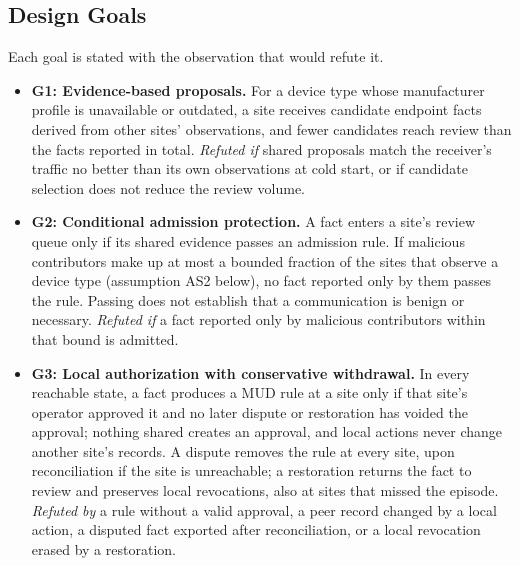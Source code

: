 \documentclass[journal]{IEEEtran}
\theoremstyle{definition}
\begin{document}
\subsection{Design Goals}
\label{subsec:goals}
Each goal is stated with the observation that would refute it.

\begin{itemize}
\item \textbf{G1: Evidence-based proposals.} For a device type whose manufacturer profile is unavailable or outdated, a site receives candidate endpoint facts derived from other sites' observations, and fewer candidates reach review than the facts reported in total. \emph{Refuted if} shared proposals match the receiver's traffic no better than its own observations at cold start, or if candidate selection does not reduce the review volume.

\item \textbf{G2: Conditional admission protection.} A fact enters a site's review queue only if its shared evidence passes an admission rule. If malicious contributors make up at most a bounded fraction of the sites that observe a device type (assumption AS2 below), no fact reported only by them passes the rule. Passing does not establish that a communication is benign or necessary. \emph{Refuted if} a fact reported only by malicious contributors within that bound is admitted.

\item \textbf{G3: Local authorization with conservative withdrawal.} In every reachable state, a fact produces a MUD rule at a site only if that site's operator approved it and no later dispute or restoration has voided the approval; nothing shared creates an approval, and local actions never change another site's records. A dispute removes the rule at every site, upon reconciliation if the site is unreachable; a restoration returns the fact to review and preserves local revocations, also at sites that missed the episode. \emph{Refuted by} a rule without a valid approval, a peer record changed by a local action, a disputed fact exported after reconciliation, or a local revocation erased by a restoration.
\end{itemize}
\end{document}
